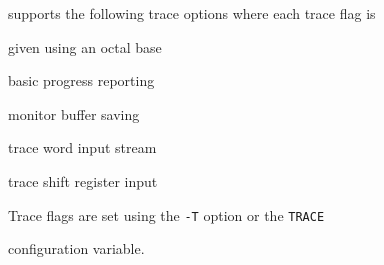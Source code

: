 




 supports the following trace options where each trace flag is 


given using an octal base


\begin{optlist}


    basic progress reporting


    monitor buffer saving


    trace word input stream


    trace shift register input


\end{optlist}


Trace flags are set using the \texttt{-T} option or the \texttt{TRACE}


configuration variable.




